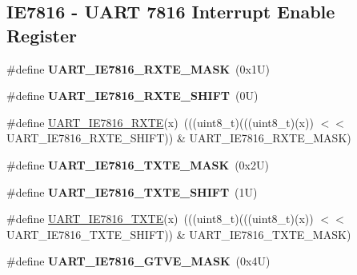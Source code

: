 \subsection*{I\+E7816 -\/ U\+A\+RT 7816 Interrupt Enable Register}
\begin{DoxyCompactItemize}
\item 
\mbox{\label{group___u_a_r_t___register___masks_gad8d954bf21c5ed93f49c9418f0b1bc5e}} 
\#define {\bfseries U\+A\+R\+T\+\_\+\+I\+E7816\+\_\+\+R\+X\+T\+E\+\_\+\+M\+A\+SK}~(0x1\+U)
\item 
\mbox{\label{group___u_a_r_t___register___masks_ga0df3e70bd53348388872ae57a8f7f156}} 
\#define {\bfseries U\+A\+R\+T\+\_\+\+I\+E7816\+\_\+\+R\+X\+T\+E\+\_\+\+S\+H\+I\+FT}~(0\+U)
\item 
\#define \mbox{\hyperlink{group___u_a_r_t___register___masks_ga89648c58d4459c6a081c0abf7eda34b8}{U\+A\+R\+T\+\_\+\+I\+E7816\+\_\+\+R\+X\+TE}}(x)~(((uint8\+\_\+t)(((uint8\+\_\+t)(x)) $<$$<$ U\+A\+R\+T\+\_\+\+I\+E7816\+\_\+\+R\+X\+T\+E\+\_\+\+S\+H\+I\+FT)) \& U\+A\+R\+T\+\_\+\+I\+E7816\+\_\+\+R\+X\+T\+E\+\_\+\+M\+A\+SK)
\item 
\mbox{\label{group___u_a_r_t___register___masks_ga5968d2ee914444772fe2e6fa65ca848b}} 
\#define {\bfseries U\+A\+R\+T\+\_\+\+I\+E7816\+\_\+\+T\+X\+T\+E\+\_\+\+M\+A\+SK}~(0x2\+U)
\item 
\mbox{\label{group___u_a_r_t___register___masks_gad0266a63ef5e0bb5dfaa2c87c2a1639e}} 
\#define {\bfseries U\+A\+R\+T\+\_\+\+I\+E7816\+\_\+\+T\+X\+T\+E\+\_\+\+S\+H\+I\+FT}~(1\+U)
\item 
\#define \mbox{\hyperlink{group___u_a_r_t___register___masks_ga3e38b84d9d75fc7645f9ab3b82966e62}{U\+A\+R\+T\+\_\+\+I\+E7816\+\_\+\+T\+X\+TE}}(x)~(((uint8\+\_\+t)(((uint8\+\_\+t)(x)) $<$$<$ U\+A\+R\+T\+\_\+\+I\+E7816\+\_\+\+T\+X\+T\+E\+\_\+\+S\+H\+I\+FT)) \& U\+A\+R\+T\+\_\+\+I\+E7816\+\_\+\+T\+X\+T\+E\+\_\+\+M\+A\+SK)
\item 
\mbox{\label{group___u_a_r_t___register___masks_ga64b8f696aa038e3a27d743e024632e7d}} 
\#define {\bfseries U\+A\+R\+T\+\_\+\+I\+E7816\+\_\+\+G\+T\+V\+E\+\_\+\+M\+A\+SK}~(0x4\+U)
\item 

\end{DoxyCompactItemize}
